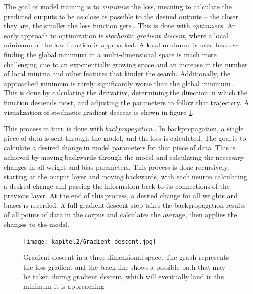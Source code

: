 The goal of model training is to \emph{minimize} the loss, meaning to calculate the predicted outputs to be as close as possible to the desired outputs -- the closer they are, the smaller the loss function gets \cite{Jurafsky.2024}.
This is done with \emph{optimizers}.
An early approach to optimization is \emph{stochastic gradient descent}, where a local minimum of the loss function is approached.
A local minimum is used because finding the global minimum in a multi-dimensional space is much more challenging due to an exponentially growing space and an increase in the number of local minima and other features that hinder the search.
Additionally, the approached minimum is rarely significantly worse than the global minimum \cite{Rumelhart.1986}.
This is done by calculating the derivative, determining the direction in which the function descends most, and adjusting the parameters to follow that trajectory.
A visualization of stochastic gradient descent is shown in figure \ref{fig:graddesc}.

This process in turn is done with \emph{backpropagation} \cite{Rumelhart.1986}.
In backpropagation, a single piece of data is sent through the model, and the loss is calculated.
The goal is to calculate a desired change in model parameters for that piece of data.
This is achieved by moving backwards through the model and calculating the necessary changes in all weight and bias parameters.
This process is done recursively, starting at the output layer and moving backwards, with each neuron calculating a desired change and passing the information back to its connections of the previous layer.
At the end of this process, a desired change for all weights and biases is recorded.
A full gradient descent step takes the backpropagation results of all points of data in the corpus and calculates the average, then applies the changes to the model.

\begin{figure}
    \centering
    \texttt{[image: kapitel2/Gradient-descent.jpg]}
    \caption{Gradient descent in a three-dimensional space. The graph represents the loss gradient and the black line shows a possible path that may be taken during gradient descent, which will eventually land in the minimum it is approaching\protect\footnotemark.}
    \label{fig:graddesc}
\end{figure}


